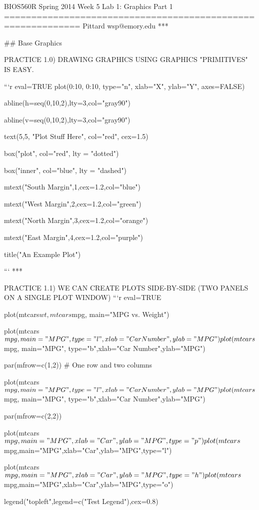 BIOS560R Spring 2014 Week 5 Lab 1: Graphics Part 1
============================================================
Pittard wsp@emory.edu
***

## Base Graphics

PRACTICE 1.0) DRAWING GRAPHICS USING GRAPHICS "PRIMITIVES" IS EASY.

```{r eval=TRUE}
plot(0:10, 0:10, type="n", xlab="X", ylab="Y", axes=FALSE)

abline(h=seq(0,10,2),lty=3,col="gray90")

abline(v=seq(0,10,2),lty=3,col="gray90")

text(5,5, "Plot Stuff Here", col="red", cex=1.5)

box("plot", col="red", lty = "dotted")

box("inner", col="blue", lty = "dashed")

mtext("South Margin",1,cex=1.2,col="blue")

mtext("West Margin",2,cex=1.2,col="green")

mtext("North Margin",3,cex=1.2,col="orange")

mtext("East Margin",4,cex=1.2,col="purple")

title("An Example Plot")

```
***

PRACTICE 1.1) WE CAN CREATE PLOTS SIDE-BY-SIDE (TWO PANELS ON A SINGLE PLOT WINDOW) 
```{r eval=TRUE}


plot(mtcars$wt, mtcars$mpg, main="MPG vs. Weight")

plot(mtcars$mpg, main="MPG", type="l",xlab="Car Number",ylab="MPG")

plot(mtcars$mpg, main="MPG", type="b",xlab="Car Number",ylab="MPG")


par(mfrow=c(1,2)) # One row and two columns

plot(mtcars$mpg, main="MPG", type="l",xlab="Car Number",ylab="MPG")

plot(mtcars$mpg, main="MPG", type="b",xlab="Car Number",ylab="MPG")



par(mfrow=c(2,2))

plot(mtcars$mpg,main="MPG",xlab="Car",ylab="MPG",type="p")

plot(mtcars$mpg,main="MPG",xlab="Car",ylab="MPG",type="l")

plot(mtcars$mpg,main="MPG",xlab="Car",ylab="MPG",type="h")

plot(mtcars$mpg,main="MPG",xlab="Car",ylab="MPG",type="o")

legend("topleft",legend=c("Test Legend"),cex=0.8)


